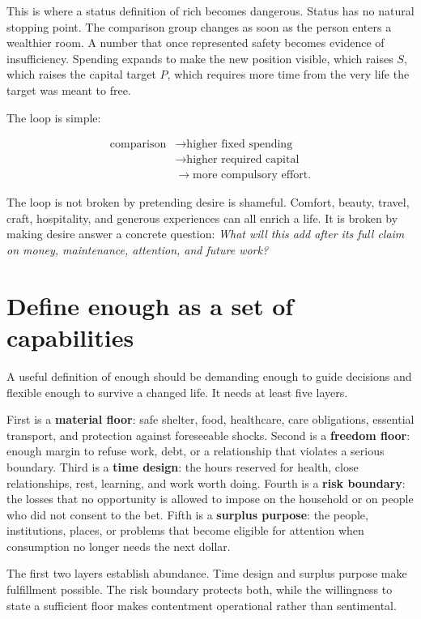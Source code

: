 This is where a status definition of rich becomes dangerous. Status has no
natural stopping point. The comparison group changes as soon as the person
enters a wealthier room. A number that once represented safety becomes evidence
of insufficiency. Spending expands to make the new position visible, which
raises $S$, which raises the capital target $P$, which requires more time
from the very life the target was meant to free.

The loop is simple:

\begin{equation}
\begin{aligned}
\text{comparison}
  &\longrightarrow \text{higher fixed spending}\\
  &\longrightarrow \text{higher required capital}\\
  &\longrightarrow \text{more compulsory effort}.
\end{aligned}
\end{equation}

The loop is not broken by pretending desire is shameful. Comfort, beauty,
travel, craft, hospitality, and generous experiences can all enrich a life. It
is broken by making desire answer a concrete question: \emph{What will this add
after its full claim on money, maintenance, attention, and future work?}

\section{Define enough as a set of capabilities}

A useful definition of enough should be demanding enough to guide decisions and
flexible enough to survive a changed life. It needs at least five layers.

First is a \textbf{material floor}: safe shelter, food, healthcare, care
obligations, essential transport, and protection against foreseeable shocks.
Second is a \textbf{freedom floor}: enough margin to refuse work, debt, or a
relationship that violates a serious boundary. Third is a \textbf{time design}:
the hours reserved for health, close relationships, rest, learning, and work
worth doing. Fourth is a \textbf{risk boundary}: the losses that no opportunity
is allowed to impose on the household or on people who did not consent to the
bet. Fifth is a \textbf{surplus purpose}: the people, institutions, places, or
problems that become eligible for attention when consumption no longer needs
the next dollar.

The first two layers establish abundance. Time design and surplus purpose make
fulfillment possible. The risk boundary protects both, while the willingness
to state a sufficient floor makes contentment operational rather than
sentimental.

